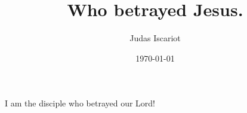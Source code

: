 \documentclass{article}
\author{Judas Iscariot}
\date{\today}
\title{Who betrayed Jesus.}
\begin{document}
    \maketitle

    I am the disciple who betrayed our Lord!
    
\end{document}
